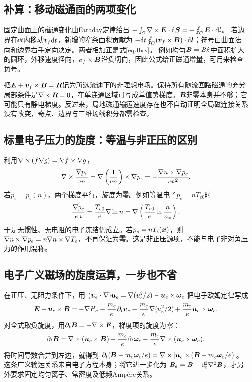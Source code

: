 \documentclass[UTF8,a4paper,11pt,openany,fontset=fandol]{ctexbook}
\begin{document}
\subsection{补算：移动磁通面的两项变化}
固定曲面上的磁通变化由Faraday定律给出
$-\int_S\nabla\times\bm{E}\cdot\mathrm d\bm{S}=-\oint_C\bm{E}\cdot\mathrm d\bm{l}$。
若边界在$\dd t$内移动$\bm{v}_f\mathrm d t$，新增的窄条面积贡献为
$-\mathrm d t\oint_C(\bm{v}_f\times\bm{B})\cdot\mathrm d\bm{l}$；符号由曲面法向和边界右手定向决定。两者相加正是式\eqref{eq:flux}。
例如均匀$\bm{B}=B\hat z$中面积扩大的圆环，外移速度径向，$\bm{v}_f\times\bm{B}$沿负切向，因此公式给正磁通增量，可用来检查负号。

把$\bm{E}+\bm{v}_f\times\bm{B}=\bm{R}$记为所选流速下的非理想电场。保持所有随流回路磁通的充分局部条件是$\nabla\times\bm{R}=0$，在单连通区域可写成单值势梯度。$\bm{R}$非零本身并不够；它可能只有静电梯度。反过来，局地磁通输运速度存在也不自动证明全局磁连接关系没有改变，奇点、边界与三维场线积分都需检查。

\subsection{标量电子压力的旋度：等温与非正压的区别}
利用$\nabla\times(f\nabla g)=\nabla f\times\nabla g$，
\begin{equation}
 \nabla\times{\nabla p_e\over en}
 =\nabla\left({1\over en}\right)\times\nabla p_e
 =-{\nabla n\times\nabla p_e\over en^2}.
\end{equation}
若$p_e=p_e(n)$，两个梯度平行，旋度为零。例如等温电子$p_e=nT_{e0}$时
\begin{equation}
 {\nabla p_e\over en}={T_{e0}\over e}\nabla\ln n
 =\nabla\left({T_{e0}\over e}\ln{n\over n_*}\right).
\end{equation}
于是无惯性、无电阻的电子冻结仍成立。若$p_e=nT_e(\bm{x})$，则
$\nabla n\times\nabla p_e=n\nabla n\times\nabla T_e$，不再保证为零。这是非正压源项，不能与电子非对角压力的作用混称。

\subsection{电子广义磁场的旋度运算，一步也不省}
在正压、无阻力条件下，用
$(\bm{u}_e\cdot\nabla)\bm{u}_e=\nabla(u_e^2/2)-\bm{u}_e\times\bm{\omega}_e$
把电子欧姆定律写成
\begin{equation}
 \bm{E}+\bm{u}_e\times\bm{B}
 =-\nabla H_e-{m_e\over e}\partial_t\bm{u}_e
 -{m_e\over e}\nabla(u_e^2/2)
 +{m_e\over e}\bm{u}_e\times\bm{\omega}_e.
\end{equation}
对全式取负旋度，用$\partial_t\bm{B}=-\nabla\times\bm{E}$，梯度项的旋度为零：
\begin{equation}
 \partial_t\bm{B}
 =\nabla\times(\bm{u}_e\times\bm{B})
 +{m_e\over e}\partial_t\bm{\omega}_e
 -{m_e\over e}\nabla\times(\bm{u}_e\times\bm{\omega}_e).
\end{equation}
将时间导数合并到左边，就得到
$\partial_t(\bm{B}-m_e\bm{\omega}_e/e)=
\nabla\times[\bm{u}_e\times(\bm{B}-m_e\bm{\omega}_e/e)]$。
这条广义输运关系来自电子方程本身；将它进一步化为
$\bm{B}_e=\bm{B}-d_e^2\nabla^2\bm{B}$，才另外要求固定均匀离子、常密度及低频Ampère关系。
\end{document}
